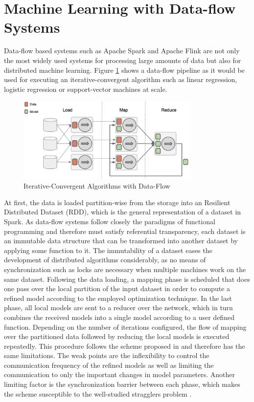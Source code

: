 \section{Machine Learning with Data-flow Systems}
\label{s:dataflow}
Data-flow based systems such as Apache Spark \cite{Zaharia2010} and Apache Flink \cite{Alexandrov2014} are not only the most widely used systems for processing large amounts of data but also for distributed machine learning.
Figure \ref{fig:ml_dataflow} shows a data-flow pipeline as it would be used for executing an iterative-convergent algorithm such as linear regression, logistic regression or support-vector machines at scale.
\begin{figure}[ht]
\centering
\includegraphics[width=0.8\textwidth]{img/ml_dataflow.png}
\caption{Iterative-Convergent Algorithms with Data-Flow}
\label{fig:ml_dataflow}
\end{figure}
At first, the data is loaded partition-wise from the storage into an Resilient Distributed Dataset (RDD), which is the general representation of a dataset in Spark.
As data-flow systems follow closely the paradigms of functional programming and therefore must satisfy referential transparency, each dataset is an immutable data structure that can be transformed into another dataset by applying some function to it.
The immutability of a dataset eases the development of distributed algorithms considerably, as no means of synchronization such as locks are necessary when multiple machines work on the same dataset.
Following the data loading, a mapping phase is scheduled that does one pass over the local partition of the input dataset in order to compute a refined model according to the employed optimization technique.
In the last phase, all local models are sent to a reducer over the network, which in turn combines the received models into a single model according to a user defined function.
Depending on the number of iterations configured, the flow of mapping over the partitioned data followed by reducing the local models is executed repeatedly.
This procedure follows the scheme proposed in \cite{zinkevich2010parallelized} and therefore has the same limitations.
The weak points are the inflexibility to control the communication frequency of the refined models as well as limiting the communication to only the important changes in model parameters.
Another limiting factor is the synchronization barrier between each phase, which makes the scheme susceptible to the well-studied stragglers problem \cite{ananthanarayanan2013effective}.

